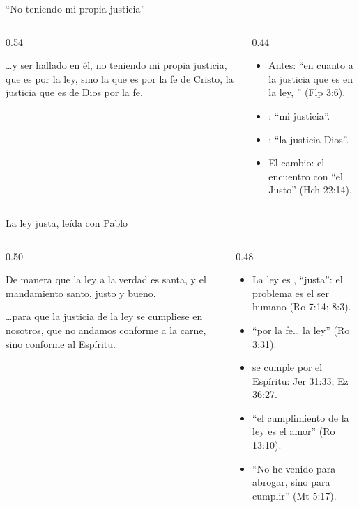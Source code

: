 \begin{frame}{``No teniendo mi propia justicia''}
\begin{columns}[c,onlytextwidth]
\begin{column}{0.54\textwidth}
\begin{cita}\ldots{}y ser hallado en él, no teniendo mi propia justicia, que es por la ley, sino la que es por la fe de Cristo, la justicia que es de Dios por la fe.\end{cita}
\end{column}
\begin{column}{0.44\textwidth}\small
\begin{itemize}
\item Antes: ``en cuanto a la justicia que es en la ley, '' (Flp 3:6).
\item {}: ``mi justicia''.
\item {}: ``la justicia  Dios''.
\item El cambio: el encuentro con ``el Justo'' (Hch 22:14).
\end{itemize}
\end{column}
\end{columns}
\end{frame}

\begin{frame}{La ley justa, leída con Pablo}
\begin{columns}[c,onlytextwidth]
\begin{column}{0.50\textwidth}
\begin{cita}De manera que la ley a la verdad es santa, y el mandamiento santo, justo y bueno.\end{cita}
\begin{cita}\ldots{}para que la justicia de la ley se cumpliese en nosotros, que no andamos conforme a la carne, sino conforme al Espíritu.\end{cita}
\end{column}
\begin{column}{0.48\textwidth}\small
\begin{itemize}
\item La ley es , ``justa'': el problema es el ser humano (Ro 7:14; 8:3).
\item ``por la fe\ldots{}  la ley'' (Ro 3:31).
\item {} se cumple por el Espíritu: Jer 31:33; Ez 36:27.
\item ``el cumplimiento de la ley es el amor'' (Ro 13:10).
\item ``No he venido para abrogar, sino para cumplir'' (Mt 5:17).
\end{itemize}
\end{column}
\end{columns}
\end{frame}

